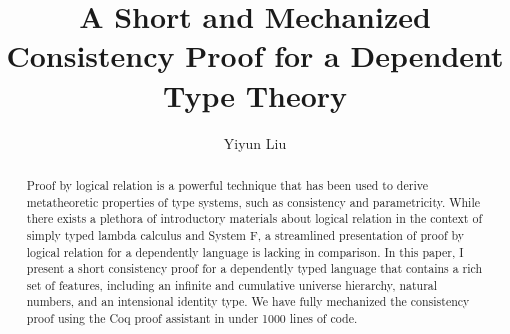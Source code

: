 \documentclass[nonacm]{acmart}
\begin{document}
\title{A Short and Mechanized Consistency Proof for a Dependent Type Theory}

\author{Yiyun Liu}


\begin{abstract}
Proof by logical relation is a powerful technique that has been used
to derive metatheoretic properties of type systems, such as
consistency and parametricity. While there exists a
plethora of introductory materials about logical relation in the
context of simply typed lambda calculus and System F, a streamlined
presentation of proof by logical relation for a dependently language
is lacking in comparison. In this paper, I present a short
consistency proof for a dependently typed language that contains a
rich set of features, including an infinite and cumulative universe
hierarchy, natural numbers, and an intensional identity type. We have
fully mechanized the consistency proof using the Coq proof assistant
in under 1000 lines of code.
\end{abstract}


\maketitle
\end{document}
